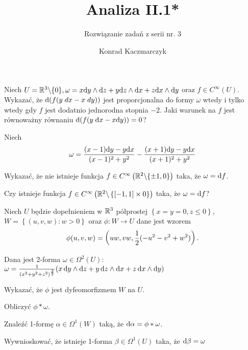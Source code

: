 \documentclass[11pt]{scrartcl}
\author{Konrad Kaczmarczyk}
\begin{document}
\title{Analiza II.1*}
    \subtitle{Rozwiązanie zadań z serii nr. 3}
    \maketitle

    \begin{zadanie*}
        Niech $
        U = \mathbb R^3 \backslash \{ 0 \}, 
        \omega = x \text{d} y \wedge \text{d} z + y \text{d} z \wedge \text{d} x + z \text{d} x \wedge \text{d} y
        $
        oraz $f \in C^\infty (U)$. Wykazać, że $\text{d} (f(y \; dx - x \; dy))$ jest
        proporcjonalna do formy $\omega$ wtedy i tylko wtedy gdy $f$ jest 
        dodatnio jednorodna stopnia $-2$. Jaki warunek na $f$ jest równoważny 
        równaniu $\text{d} (f(y \; \text{d} x - x \text{d} y)) = 0$?
    \end{zadanie*}

    \begin{zadanie*}
        Niech
        \[
            \omega = \frac{(x-1) \text{d} y - y \text{d} x}{(x-1)^2 + y^2} -
            \frac{(x+1) \text{d} y - y \text{d} x}{(x+1)^2 + y^2}
        \]
        \begin{walk}
            \item Wykazać, że nie istnieje funkcja 
                $f \in C^\infty \left ( \mathbb R^2 \backslash \{ \pm 1, 0 \} \right )$
                taka, że $\omega = \text{d} f$.
            \item Czy istnieje funkcja 
                $f \in C^\infty \left ( 
                    \mathbb R^2 \backslash \left \{ [-1, 1] \times 0 \right \} 
                \right )$ taka, że $\omega = \text{d} f$?
        \end{walk}
    \end{zadanie*}

    \begin{zadanie*}
        Niech $U$ będzie dopełnieniem w $\mathbb R^3$ półprostej 
        $\left \{ x = y = 0, z \leq 0 \right \}$, 
        $W = \left \{ (u,v, w) : w > 0 \right \}$ oraz $\phi : W \to U$ dane jest wzorem
        \[
            \phi (u, v, w) = \left ( uw, vw, \frac{1}{2} (-u^2 - v^2 + w^2) \right ).
        \]

        Dana jest 2-forma $\omega \in \Omega^2 (U)$: 
        $\omega = \frac{1}{(x^2 + y^2 + z^2)^{\frac{3}{2}}} 
            ( x \, \text{d} y \wedge \text{d} z + y \, \text{d} z \wedge \text{d} x + z \, \text{d} x \wedge \text{d} y)$
        
        \begin{walk}
            \item Wykazać, że $\phi$ jest dyfeomorfizmem $W$ na $U$.
            \item Obliczyć $\phi* \omega$.
            \item Znaleźć 1-formę $\alpha \in \Omega^1 (W)$ taką, że 
                $\text{d} \alpha = \phi* \omega$.
            \item Wywnioskować, że istnieje 1-forma $\beta \in \Omega^1 (U)$ 
                taka, że $\text{d} \beta = \omega$
        \end{walk}
    \end{zadanie*}
\end{document}

